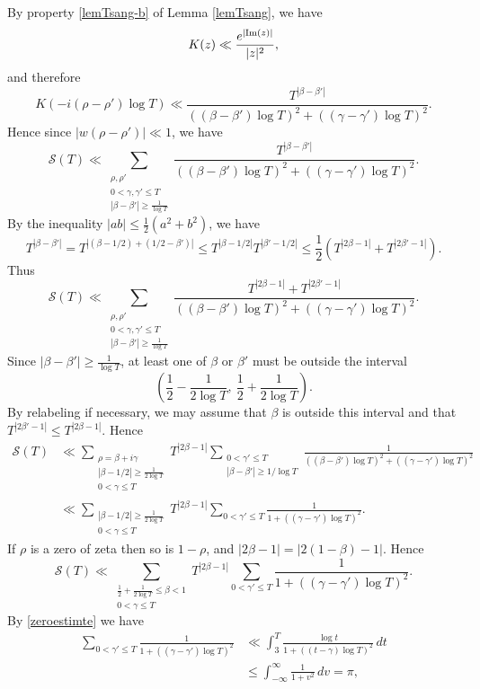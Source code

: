 \documentclass{amsart}
\newcommand{\1}{\mathbbm{1}}
\theoremstyle{remark}
\numberwithin{equation}{section}
\begin{document}
By property \ref{lemTsang-b} of Lemma \ref{lemTsang}, we have
$$ K(z) \ll \frac{e^{|{\rm Im} (z)|}} {|z|^2}, $$
and therefore
$$
K(-i(\rho -\rho')\log T)
\ll \frac{T^{|\beta-\beta'|}} {((\beta-\beta')\log T)^2+((\gamma-\gamma')\log T)^2}.
$$
Hence since $|w(\rho-\rho')|\ll 1$, we have 
\[ \mathcal{S}(T) 
\ll \sum_{\substack{\rho, \rho' \\ 0<\gamma,\gamma'\le T\\ |\beta-\beta'| \ge \frac1{\log T}}} \frac{T^{|\beta-\beta'|}} {((\beta-\beta')\log T)^2+((\gamma-\gamma')\log T)^2}.\]
By the inequality $|ab|\le \frac12(a^2 +b^2)$, we have 
\[ T^{|\beta-\beta'|} = T^{|(\beta-1/2)+(1/2-\beta')|}\le T^{|\beta-1/2|} T^{|\beta'-1/2|}\le \frac12\left(T^{|2\beta-1|}+ T^{|2\beta'-1|}\right). \]
Thus
\[ \mathcal{S}(T) 
\ll \sum_{\substack{\rho, \rho' \\ 0<\gamma,\gamma'\le T\\ |\beta-\beta'| \ge \frac1{\log T}}} \frac{T^{|2\beta-1|}+ T^{|2\beta'-1|}} {((\beta-\beta')\log T)^2+((\gamma-\gamma')\log T)^2}.\]
Since $|\beta-\beta'| \ge \frac1{\log T}$, at least one of $\beta$ or $\beta'$ must be outside the interval 
$$\left(\frac12-\frac1{2\log T},\ \frac12+\frac1{2\log T}\right). $$
By relabeling if necessary, we may assume that $\beta$ is outside this interval and that $T^{|2\beta'-1|}\leq T^{|2\beta-1|}$. Hence
\[ \begin{split} \mathcal{S}(T) &\ll \sum_{\substack{\rho=\beta+i\gamma \\ |\beta-1/2| \ge \frac1{2\log T}\\ 0<\gamma \le T}} T^{|2\beta-1|} \sum_{\substack{0<\gamma'\le T \\ |\beta-\beta'| \ge 1/\log T }} \frac1 {((\beta-\beta')\log T)^2+((\gamma-\gamma')\log T)^2}\\&
\ll \sum_{\substack{|\beta-1/2| \ge \frac1{2\log T}\\ 0<\gamma \le T}} T^{|2\beta-1|} \sum_{0<\gamma'\le T} \frac1 {1+((\gamma-\gamma')\log T)^2}. \end{split} \]
If $\rho$ is a zero of zeta then so is $1-\rho$, and $|2\beta-1|=|2(1-\beta)-1|$. Hence
\[ \mathcal{S}(T) \ll \sum_{\substack{\frac12 + \frac1{2\log T} \le \beta< 1\\ 0<\gamma \le T}} T^{|2\beta-1|} \sum_{0<\gamma'\le T} \frac1 {1+((\gamma-\gamma')\log T)^2}. \]
By \eqref{zeroestimte} we have
\begin{equation}\label{S(T)inner_sum}
\begin{aligned}
\sum_{0<\gamma'\le T} \frac1 {1 +((\gamma-\gamma')\log T)^2} &\ll \int_3^T 
\frac {\log t} {1+((t-\gamma)\log T)^2}\, dt \\&
\le \int_{-\infty}^{\infty} \frac {1} {1+ v^2}\, dv 
= \pi,
\end{aligned}
\end{equation}
\end{document}
